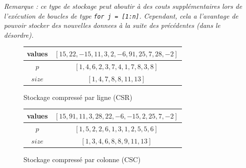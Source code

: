 \documentclass[12pt]{report}
\begin{document}
\textit{Remarque : ce type de stockage peut aboutir à des couts supplémentaires lors de l'exécution de boucles de type \texttt{for j = [1:n]}. Cependant, cela a l'avantage de pouvoir stocker des nouvelles donnees à la suite des précédentes (dans le désordre).}

\begin{figure}[H]
\centering
\begin{tabular}{|c|c|}
\hline
values		&   $\left[ 15, 22, -15, 11, 3, 2, -6, 91, 25, 7, 28, -2\right]$ \\ \hline
$p$ &  $\left[ 1, 4, 6, 2, 3, 7, 4, 1, 7, 8, 3, 8\right]$  \\  \hline
$size$ &$\left[ 1, 4, 7,8 , 8, 11, 13\right]$ \\  \hline
\end{tabular}
\caption{Stockage compressé par ligne (CSR)}
\end{figure}

\begin{figure}[H]
\centering
\begin{tabular}{|c|c|}
\hline
values		&   $\left[ 15, 91, 11, 3, 28, 22, -6, -15, 2, 25, 7, -2\right]$ \\ \hline
$p$ &  $\left[ 1, 5, 2, 2, 6, 1, 3, 1, 2, 5, 5, 6 \right]$  \\  \hline
$size$ &$\left[ 1, 3, 4, 6, 8, 8, 9, 11, 13\right]$ \\  \hline
\end{tabular}
\caption{Stockage compressé par colonne (CSC)}
\end{figure}


%
\end{document}
